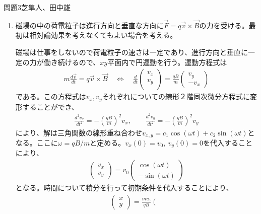 \documentclass[fleqn]{jbook}
\begin{document}
    \begin{answer}{問題3}{芝隼人、田中雄}
	\begin{enumerate}
	    \item
		 磁場の中の荷電粒子は進行方向と垂直な方向に$\vec{F}=q\vec{v}\times\vec{B}$の力を受ける。最初は相対論効果を考えなくてもよい場合を考える。

		 磁場は仕事をしないので荷電粒子の速さは一定であり、進行方向と垂直に一定の力が働き続けるので、$xy$平面内で円運動を行う。運動方程式は
		 \begin{eqnarray}
		     m\frac{d\vec{v}}{dt} = q\vec{v}\times\vec{B} \quad \Leftrightarrow\quad \frac{d}{dt}\left(
													  \begin{array}{c}{}
		 v_x \\ v_y \\ \end{array}
		     \right) = \frac{qB}{m}\left( \begin{array}{c}{}
		     v_y  \\ -v_x \end{array} \right)
		     \end{eqnarray}
		     である。この方程式は$v_x,v_y$それぞれについての線形２階同次微分方程式に変形することができ、
		     \begin{eqnarray}
		     \frac{d^2v_x}{dt^2} = -\left(\frac{qB}{m}\right)^2 v_x, \qquad \frac{d^2v_y}{dt^2} = -\left(\frac{qB}{m}\right)^2 v_y
		     \end{eqnarray}
		     により、解は三角関数の線形重ね合わせ$v_{x,y} = c_1\cos (\omega t)+c_2\sin (\omega t)$となる。ここに$\omega =qB/m$と定める。$v_x(0)=v_0,\ v_y(0)=0 $を代入することにより、
		     \begin{eqnarray}
			 \left( \begin{array}{c}{}
				   v_x \\ v_y \end{array}\right) =v_0 \left( \begin{array}{c}{}
				   \cos (\omega t) \\ -\sin (\omega t) \end{array}\right)
				   \end{eqnarray}
				   となる。時間について積分を行って初期条件を代入することにより、
				   \begin{eqnarray}
				       \left( \begin{array}{c}{}
					   x \\ y \end{array}\right) = \frac{mv_0}{qB}\left( \begin{array}{c}{}

\end{array}
\end{eqnarray}
\end{enumerate}
\end{answer}
\end{document}

